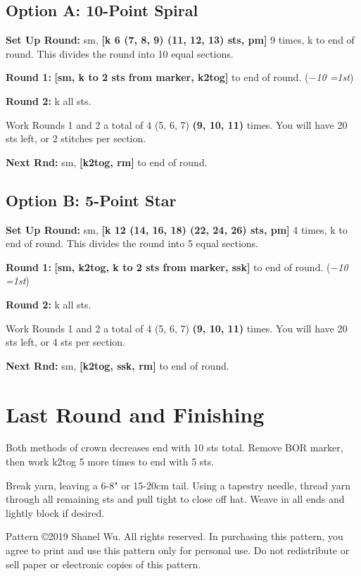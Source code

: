 \documentclass[12pt]{article}
\newcommand{\rowDir}[1]{\textbf{#1:}} %
\renewcommand{\repeat}[1]{\textbf{[#1]}} %
\newcommand{\decrease}[1]{(\emph{$-$#1
	\ifnum#1=1{st}\else{sts}\fi})}
\newenvironment{frnote}
    {%
    	\setlength{\FrameRule}{1.5pt}
    	\def\FrameCommand{\fboxrule=\FrameRule\fboxsep=\FrameSep \fcolorbox{framecolor}{shadecolor}}
    	\MakeFramed {\FrameRestore}}
    {\setlength{\FrameRule}{1pt}
	\endMakeFramed}
\begin{document}
\begin{multicols}{2}
\subsection*{Option A: 10-Point Spiral}

\rowDir{Set Up Round} sm, \repeat{k 6 (7, 8, 9) (11, 12, 13) sts, pm} 9 times, k to end of round. This divides the round into 10 equal sections.

\rowDir{Round 1} \repeat{sm, k to 2 sts from marker, k2tog} to end of round. \decrease{10}

\rowDir{Round 2} k all sts.

Work Rounds 1 and 2 a total of 4 (5, 6, 7) \textbf{(9, 10, 11)} times. You will have 20 sts left, or 2 stitches per section.

\rowDir{Next Rnd} sm, \repeat{k2tog, rm} to end of round.

\subsection*{Option B: 5-Point Star}

\rowDir{Set Up Round} sm, \repeat{k 12 (14, 16, 18) (22, 24, 26) sts, pm} 4 times, k to end of round. This divides the round into 5 equal sections.

\rowDir{Round 1} \repeat{sm, k2tog, k to 2 sts from marker, ssk} to end of round. \decrease{10}

\rowDir{Round 2} k all sts.

Work Rounds 1 and 2 a total of 4 (5, 6, 7) \textbf{(9, 10, 11)} times. You will have 20 sts left, or 4 sts per section.

\rowDir{Next Rnd} sm, \repeat{k2tog, ssk, rm} to end of round.

\section*{Last Round and Finishing}

Both methods of crown decreases end with 10 sts total. Remove BOR marker, then work k2tog 5 more times to end with 5 sts. 

Break yarn, leaving a 6-8" or 15-20cm tail. Using a tapestry needle, thread yarn through all remaining sts and pull tight to close off hat. Weave in all ends and lightly block if desired.

\vfill
\begin{frnote}
\ssmall Pattern \copyright 2019 Shanel Wu. All rights reserved. In purchasing this pattern, you agree to print and use this pattern only for personal use. Do not redistribute or sell paper or electronic copies of this pattern.
\end{frnote}
\columnbreak

\end{multicols}
\end{document}
